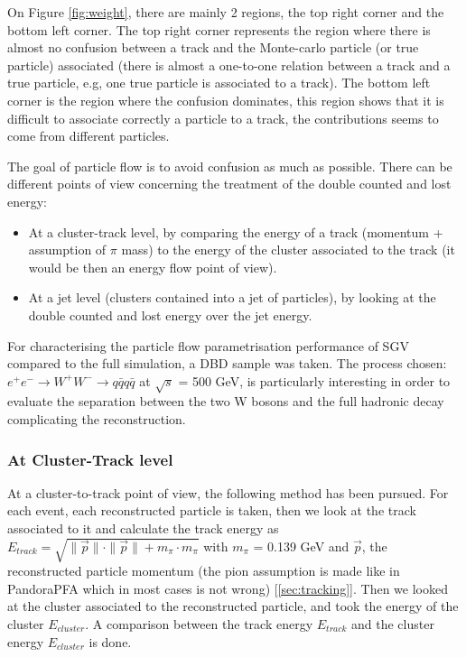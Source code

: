 \documentclass[a4paper,12pt]{article}
\begin{document}
On Figure \ref{fig:weight}, there are mainly 2 regions, the top right corner and the bottom left corner. The top right corner represents the region where there is almost no confusion between a track and the Monte-carlo particle (or true particle) associated (there is almost a one-to-one relation between a track and a true particle, e.g, one true particle is associated to a track). The bottom left corner is the region where the confusion dominates, this region shows that it is difficult to associate correctly a particle to a track, the contributions seems to come from different particles.

The goal of particle flow is to avoid confusion as much as possible. There can be different points of view concerning the treatment of the double counted and lost energy: 
\begin{itemize}
\item At a cluster-track level, by comparing the energy of a track (momentum + assumption of $\pi$ mass) to the energy of the cluster associated to the track (it would be then an energy flow point of view).
\item At a jet level (clusters contained into a jet of particles), by looking at the double counted and lost energy over the jet energy.
\end{itemize}

For characterising the particle flow parametrisation performance of SGV compared to the full simulation, a DBD sample was taken. The process chosen: $e^+e^- \rightarrow W^+W^- \rightarrow q\bar{q} q\bar{q}$ at $\sqrt{s}$ = 500 GeV, is particularly interesting in order to evaluate the separation between the two W bosons and the full hadronic decay complicating the reconstruction. 

\subsubsection{At Cluster-Track level}

At a cluster-to-track point of view, the following method has been pursued. For each event, each reconstructed particle is taken, then we look at the track associated to it and calculate the track energy as $E_{track} = \sqrt{\|\overrightarrow{p}\| \cdot \|\overrightarrow{p}\| + m_{\pi} \cdot m_{\pi}}$ with $m_{\pi}$ = 0.139 GeV and $\overrightarrow{p}$, the reconstructed particle momentum (the pion assumption is made like in PandoraPFA which in most cases is not wrong) [\ref{sec:tracking}]. Then we looked at the cluster associated to the reconstructed particle, and took the energy of the cluster $E_{cluster}$. A comparison between the track energy $E_{track}$ and the cluster energy $E_{cluster}$ is done. 
\end{document}
